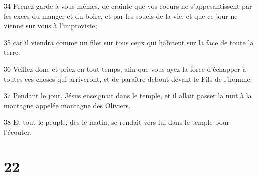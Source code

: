 \par 34 Prenez garde à vous-mêmes, de crainte que vos coeurs ne s'appesantissent par les excès du manger et du boire, et par les soucis de la vie, et que ce jour ne vienne sur vous à l'improviste;
\par 35 car il viendra comme un filet sur tous ceux qui habitent sur la face de toute la terre.
\par 36 Veillez donc et priez en tout temps, afin que vous ayez la force d'échapper à toutes ces choses qui arriveront, et de paraître debout devant le Fils de l'homme.
\par 37 Pendant le jour, Jésus enseignait dans le temple, et il allait passer la nuit à la montagne appelée montagne des Oliviers.
\par 38 Et tout le peuple, dès le matin, se rendait vers lui dans le temple pour l'écouter.

\chapter{22}

